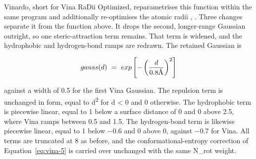 Vinardo, short for Vina RaDii Optimized, reparametrises this function within the same program and additionally re-optimises the atomic radii \cite{ref023}, \cite{ref073}. Three changes separate it from the function above. It drops the second, longer-range Gaussian outright, so one steric-attraction term remains. That term is widened, and the hydrophobic and hydrogen-bond ramps are redrawn. The retained Gaussian is

\begin{equation}
{gauss}(d)\  = \ exp\left\lbrack - \left( \frac{d}{0.8\text{\AA}{}} \right)^{2} \right\rbrack
\label{eq:vinardo-1}
\end{equation}

against a width of 0.5\angstrom{} for the first Vina Gaussian. The repulsion term is unchanged in form, equal to d\textsuperscript{2} for d \textless{} 0 and 0 otherwise. The hydrophobic term is piecewise linear, equal to 1 below a surface distance of 0\angstrom{} and 0 above 2.5\angstrom{}, where Vina ramps between 0.5 and 1.5\angstrom{}. The hydrogen-bond term is likewise piecewise linear, equal to 1 below \ensuremath{-}0.6\angstrom{} and 0 above 0, against \ensuremath{-}0.7\angstrom{} for Vina. All terms are truncated at 8\angstrom{} as before, and the conformational-entropy correction of Equation~\ref{eq:vina-5} is carried over unchanged with the same N\_rot weight.

